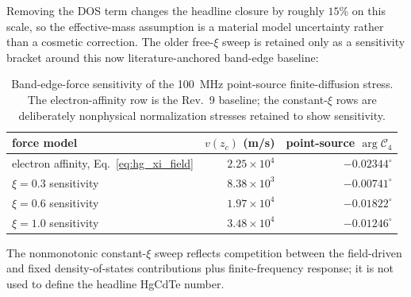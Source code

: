 \documentclass[11pt]{article}
\begin{document}
Removing the DOS term changes the headline closure by roughly $15\%$ on this scale, so the effective-mass assumption is a material model uncertainty rather than a cosmetic correction. The older free-$\xi$ sweep is retained only as a sensitivity bracket around this now literature-anchored band-edge baseline:
\begin{table}[H]
\centering
\caption{Band-edge-force sensitivity of the \SI{100}{MHz} point-source finite-diffusion stress. The electron-affinity row is the Rev.~9 baseline; the constant-$\xi$ rows are deliberately nonphysical normalization stresses retained to show sensitivity.}
\label{tab:hg_xi_sweep}
\begin{tabular}{lrr}
\toprule
force model & $v(z_c)$ (m/s) & point-source $\arg\mathcal C_4$ \\
\midrule
electron affinity, Eq.~\eqref{eq:hg_xi_field} & $2.25\times10^4$ & $-0.02344^\circ$ \\
$\xi=0.3$ sensitivity & $8.38\times10^3$ & $-0.00741^\circ$ \\
$\xi=0.6$ sensitivity & $1.97\times10^4$ & $-0.01822^\circ$ \\
$\xi=1.0$ sensitivity & $3.48\times10^4$ & $-0.01246^\circ$ \\
\bottomrule
\end{tabular}
\end{table}
The nonmonotonic constant-$\xi$ sweep reflects competition between the field-driven and fixed density-of-states contributions plus finite-frequency response; it is not used to define the headline HgCdTe number.
\end{document}
